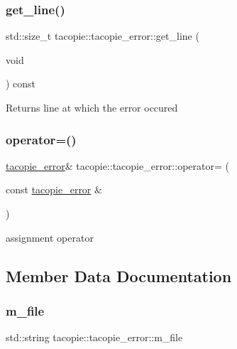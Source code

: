 \subsubsection{\texorpdfstring{get\+\_\+line()}{get\_line()}}
{\footnotesize\ttfamily std\+::size\+\_\+t tacopie\+::tacopie\+\_\+error\+::get\+\_\+line (\begin{DoxyParamCaption}\item[{void}]{ }\end{DoxyParamCaption}) const}

\begin{DoxyReturn}{Returns}
line at which the error occured 
\end{DoxyReturn}
\mbox{\label{classtacopie_1_1tacopie__error_ad30ae4932d33b460f75570f5f3a6e3f3}} 
\subsubsection{\texorpdfstring{operator=()}{operator=()}}
{\footnotesize\ttfamily \hyperlink{classtacopie_1_1tacopie__error}{tacopie\+\_\+error}\& tacopie\+::tacopie\+\_\+error\+::operator= (\begin{DoxyParamCaption}\item[{const \hyperlink{classtacopie_1_1tacopie__error}{tacopie\+\_\+error} \&}]{ }\end{DoxyParamCaption})\hspace{0.3cm}{\ttfamily [default]}}



assignment operator 



\subsection{Member Data Documentation}
\mbox{\label{classtacopie_1_1tacopie__error_a34c06192d25e3c78b1aed8b0c2ead413}} 
\subsubsection{\texorpdfstring{m\+\_\+file}{m\_file}}
{\footnotesize\ttfamily std\+::string tacopie\+::tacopie\+\_\+error\+::m\+\_\+file\hspace{0.3cm}{\ttfamily [private]}}

